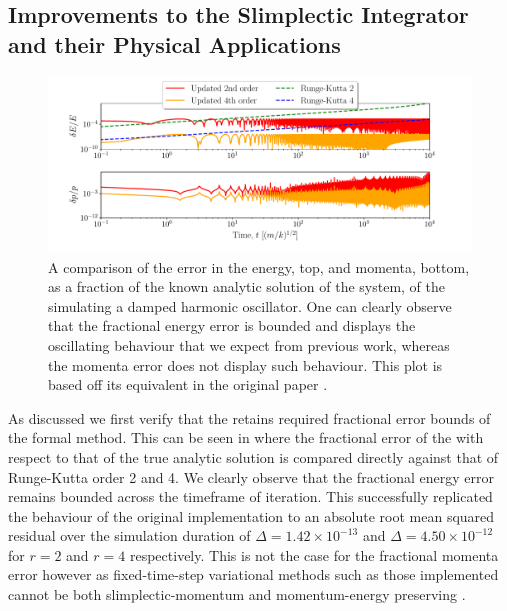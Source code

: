 \subsection{Improvements to the Slimplectic Integrator and their Physical Applications}
\label{sec:results-si}

\begin{figure}[t]
  \includegraphics[width=\columnwidth]{figures/dho_energy_momenta_fractional_err.pdf}
  \caption{A comparison of the error in the energy, top, and momenta, bottom, as a fraction of the known analytic solution of the system, of the \updimpl{} simulating a damped harmonic oscillator. One can clearly observe that the fractional energy error is bounded and displays the oscillating behaviour that we expect from previous work, whereas the momenta error does not display such behaviour. This plot is based off its equivalent in the original paper \cite[Figure 2, bottom]{tsangSLIMPLECTICINTEGRATORSVARIATIONAL2015}.}
\label{fig:dho_energy_bounds}
\end{figure}

As discussed we first verify that the \updimpl{} retains required fractional error bounds of the formal method. This can be seen in  where the fractional error of the \updimpl{} with respect to that of the true analytic solution is compared directly against that of Runge-Kutta order 2 and 4. We clearly observe that the fractional energy error remains bounded across the timeframe of iteration.
This successfully replicated the behaviour of the original implementation to an absolute root mean squared residual over the simulation duration of $\Delta = 1.42 \times 10^{-13}$ and $\Delta = 4.50 \times 10^{-12}$ for $r = 2$ and $r = 4$ respectively.
This is not the case for the fractional momenta error however as fixed-time-step variational methods such as those implemented cannot be both slimplectic-momentum and momentum-energy preserving \cite{zhongLiePoissonHamiltonJacobiTheory1988}.

